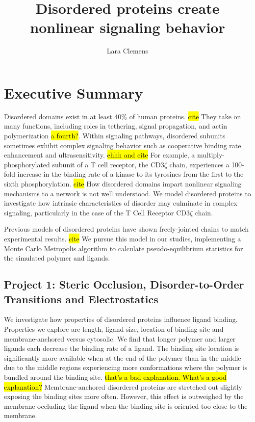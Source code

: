 \documentclass[onecolumn]{article}
\begin{document}
\newcommand{\citel}[1]{\citep{#1}}
\newcommand{\citelt}[1]{\citet{#1}}

\def\Tevac{T_{1/2}^{\mbox{\,\scriptsize evac}}}
\def\Treturn{T_{1/2}^{\mbox{\,\scriptsize return}}}
\def\toffbar{\bar{t}_{\mbox{\scriptsize off}}}
\def\toff{{t}_{\mbox{\scriptsize off}}}
\def\Peclet{P\'{e}clet}

\title{Disordered proteins create nonlinear signaling behavior}
\author{Lara Clemens}
\date{}

\maketitle
\section{Executive Summary}


Disordered domains exist in at least 40\% of human proteins. \hl{cite} They take on many functions, including roles in tethering, signal propagation, and actin polymerization \hl{a fourth?}. Within signaling pathways, disordered subunits sometimes exhibit complex signaling behavior such as cooperative binding rate enhancement and ultrasensitivity. \hl{ehhh and cite} For example, a multiply-phosphorylated subunit of a T cell receptor, the CD3$\zeta$ chain, experiences a 100-fold increase in the binding rate of a kinase to its tyrosines from the first to the sixth phosphorylation. \hl{cite} How disordered domains impart nonlinear signaling mechanisms to a network is not well understood. We model disordered proteins to investigate how intrinsic characteristics of disorder may culminate in complex signaling, particularly in the case of the T Cell Receptor CD3$\zeta$ chain. 

Previous models of disordered proteins have shown freely-jointed chains to match experimental results. \hl{cite} We pursue this model in our studies, implementing a Monte Carlo Metropolis algorithm to calculate pseudo-equilibrium statistics for the simulated polymer and ligands.

\subsection*{Project 1: Steric Occlusion, Disorder-to-Order Transitions and Electrostatics}

We investigate how properties of disordered proteins influence ligand binding. Properties we explore are length, ligand size, location of binding site and membrane-anchored versus cytosolic. We find that longer polymer and larger ligands each decrease the binding rate of a ligand. The binding site location is significantly more available when at the end of the polymer than in the middle due to the middle regions experiencing more conformations where the polymer is bundled around the binding site. \hl{that's a bad explanation.  What's a good explanation?} Membrane-anchored disordered proteins are stretched out slightly exposing the binding sites more often.  However, this effect is outweighed by the membrane occluding the ligand when the binding site is oriented too close to the membrane.
\end{document}
